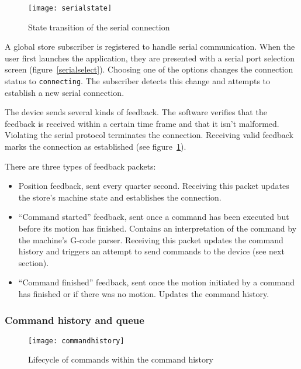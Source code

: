 \begin{figure}[ht]
    \begin{center}
        \texttt{[image: serialstate]}
        \caption{State transition of the serial connection}
        \label{serialstate}
    \end{center}
\end{figure}

A global store subscriber is registered to handle serial communication. When the
user first launches the application, they are presented with a serial port
selection screen (figure~\ref{serialselect}). Choosing one of the options
changes the connection status to \texttt{connecting}. The subscriber detects
this change and attempts to establish a new serial connection.

The device sends several kinds of feedback. The software verifies that the
feedback is received within a certain time frame and that it isn't malformed.
Violating the serial protocol terminates the connection. Receiving valid
feedback marks the connection as established (see figure~\ref{serialstate}).

There are three types of feedback packets:

\begin{itemize}
    \item Position feedback, sent every quarter second. Receiving this packet
    updates the store's machine state and establishes the connection.
    \item ``Command started'' feedback, sent once a command has been executed
    but before its motion has finished. Contains an interpretation of the
    command by the machine's G-code parser. Receiving this packet updates
    the command history and triggers an attempt to send commands to the device
    (see next section).
    \item ``Command finished'' feedback, sent once the motion initiated by a
    command has finished or if there was no motion. Updates the command history.
\end{itemize}

\subsubsection{Command history and queue}
\label{sending}

\begin{figure}[ht]
    \begin{center}
        \texttt{[image: commandhistory]}
        \caption{Lifecycle of commands within the command history}
        \label{commandhistory}
    \end{center}
\end{figure}

